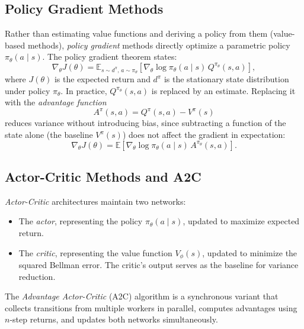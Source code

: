 \documentclass[11pt,a4paper,twoside]{tesis}
\begin{document}
\subsection{Policy Gradient Methods}

Rather than estimating value functions and deriving a policy from them (value-based
methods), \emph{policy gradient} methods directly optimize a parametric policy
$\pi_\theta(a \mid s)$. The policy gradient theorem \cite{sutton2018rl,
williams1992reinforce} states:
\[
\nabla_\theta J(\theta) = \mathbb{E}_{s \sim d^\pi,\, a \sim \pi_\theta}\left[
    \nabla_\theta \log \pi_\theta(a \mid s)\, Q^{\pi_\theta}(s, a)\right],
\]
where $J(\theta)$ is the expected return and $d^\pi$ is the stationary state distribution
under policy $\pi_\theta$. In practice, $Q^{\pi_\theta}(s,a)$ is replaced by an
estimate. Replacing it with the \emph{advantage function}
\[
A^\pi(s, a) = Q^\pi(s, a) - V^\pi(s)
\]
reduces variance without introducing bias, since subtracting a function of the state
alone (the baseline $V^\pi(s)$) does not affect the gradient in expectation:
\[
\nabla_\theta J(\theta) = \mathbb{E}\left[
    \nabla_\theta \log \pi_\theta(a \mid s)\, A^{\pi_\theta}(s, a)\right].
\]

\subsection{Actor-Critic Methods and A2C}

\emph{Actor-Critic} architectures maintain two networks:
\begin{itemize}
  \item The \emph{actor}, representing the policy $\pi_\theta(a \mid s)$, updated to
    maximize expected return.
  \item The \emph{critic}, representing the value function $V_\phi(s)$, updated to
    minimize the squared Bellman error. The critic's output serves as the baseline for
    variance reduction.
\end{itemize}

The \emph{Advantage Actor-Critic} (A2C) algorithm
\cite{mnih2016asynchronous} is a synchronous variant that collects transitions from
multiple workers in parallel, computes advantages using $n$-step returns, and updates
both networks simultaneously.
\end{document}
